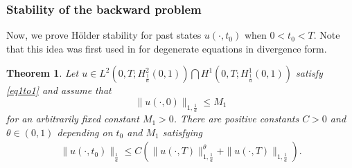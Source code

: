 \documentclass[reqno]{amsart}
\theoremstyle{plain}
\newtheorem{theorem}{Theorem}[section]
\theoremstyle{remark}
\numberwithin{equation}{section}
\begin{document}
\subsubsection{\textbf{Stability of the backward problem}}
Now, we prove H\"older stability for past states $u(\cdot,t_0)$ when $0<t_{0}<T$. Note that this idea was first used in \cite{CY23} for degenerate equations in divergence form.
\begin{theorem}\label{15}
Let $u \in L^2\left(0,T;H^2_{\frac{1}{a}}(0,1)\right)\bigcap H^1\left(0,T; H^1_{\frac{1}{a}}(0,1)\right)$ satisfy \eqref{eq1to1} and assume that 
$$\| u(\cdot,0)\|_{1,\frac{1}{a}}\leq M_1$$
for an arbitrarily fixed constant \( M_1 > 0 \). There are positive constants $C>0$ and $\theta \in (0,1)$ depending on $t_{0}$ and $M_1$ satisfying
\begin{align}
    \| u(\cdot,t_{0})\|_{\frac{1}{a}}\leqslant C\left( \| u(\cdot,T)\|^{\theta}_{1,\frac{1}{a}}+\| u(\cdot,T)\|_{1,\frac{1}{a}}\right).
\end{align}
  
\end{theorem}
\end{document}
